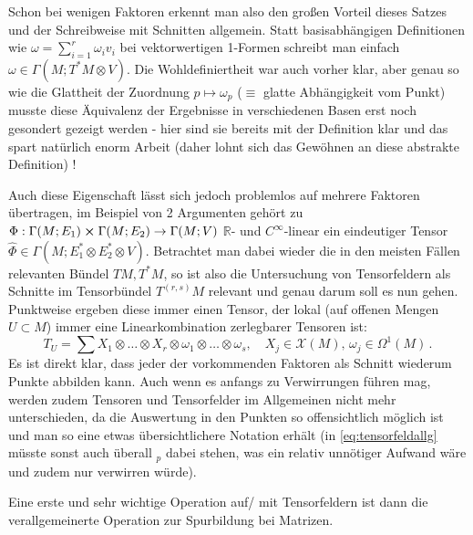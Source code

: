 \documentclass[../H_Analysis_main.tex]{subfiles}
\begin{document}

Schon bei wenigen Faktoren erkennt man also den großen Vorteil dieses Satzes und der Schreibweise mit Schnitten allgemein. Statt basisabhängigen Definitionen wie $\omega = \sum_{i = 1}^r \omega_i v_i$ bei vektorwertigen 1-Formen schreibt man einfach  $\omega \in \Gamma(M; T^*M \otimes V)$. Die Wohldefiniertheit war auch vorher klar, aber genau so wie die Glattheit der Zuordnung $p \mapsto \omega_p$ ($\equiv$ glatte Abhängigkeit vom Punkt) musste diese Äquivalenz der Ergebnisse in verschiedenen Basen erst noch gesondert gezeigt werden - hier sind sie bereits mit der Definition klar und das spart natürlich enorm Arbeit (daher lohnt sich das Gewöhnen an diese abstrakte Definition) !

Auch diese Eigenschaft lässt sich jedoch problemlos auf mehrere Faktoren übertragen, im Beispiel von 2 Argumenten gehört zu $\Phi: \Gamma(M; E_1) \cross \Gamma(M; E_2) \rightarrow \Gamma(M; V)$ $\mathbb{R}$- und $C^\infty$-linear ein eindeutiger Tensor $\hat{\Phi} \in \Gamma(M; E^*_1 \otimes E^*_2 \otimes V)$. Betrachtet man dabei wieder die in den meisten Fällen relevanten Bündel $TM, T^*M$, so ist also die Untersuchung von Tensorfeldern als Schnitte im Tensorbündel $T^{(r, s)}M$ relevant und genau darum soll es nun gehen. Punktweise ergeben diese immer einen Tensor, der lokal (auf offenen Mengen $U \subset M$) immer eine Linearkombination zerlegbarer Tensoren ist:
\begin{equation}\label{eq:tensorfeldallg}
T_U = \sum X_1 \otimes \dots \otimes X_r \otimes \omega_1 \otimes \dots \otimes \omega_s, \quad X_j \in \mathcal{X}(M), \, \omega_j \in \Omega^1(M) \, . 
\end{equation}
Es ist direkt klar, dass jeder der vorkommenden Faktoren als Schnitt wiederum Punkte abbilden kann. Auch wenn es anfangs zu Verwirrungen führen mag, werden zudem Tensoren und Tensorfelder im Allgemeinen nicht mehr unterschieden, da die Auswertung in den Punkten so offensichtlich möglich ist und man so eine etwas übersichtlichere Notation erhält (in \eqref{eq:tensorfeldallg} müsste sonst auch überall ${}_p$ dabei stehen, was ein relativ unnötiger Aufwand wäre und zudem nur verwirren würde).


Eine erste und sehr wichtige Operation auf/ mit Tensorfeldern ist dann die verallgemeinerte Operation zur Spurbildung bei Matrizen.
\end{document}
